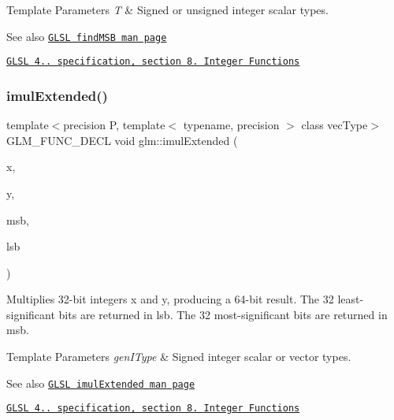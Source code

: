 \begin{DoxyTemplParams}{Template Parameters}
{\em T} & Signed or unsigned integer scalar types.\\
\hline
\end{DoxyTemplParams}
\begin{DoxySeeAlso}{See also}
\href{http://www.opengl.org/sdk/docs/manglsl/xhtml/findMSB.xml}{\tt G\+L\+SL find\+M\+SB man page} 

\href{http://www.opengl.org/registry/doc/GLSLangSpec.4.20.8.pdf}{\tt G\+L\+SL 4.. specification, section 8. Integer Functions} 
\end{DoxySeeAlso}
\mbox{\label{group__core__func__integer_ga6e6e8b29ca40d8ca2df10b58ed17d426}} 
\subsubsection{\texorpdfstring{imul\+Extended()}{imulExtended()}}
{\footnotesize\ttfamily template$<$precision P, template$<$ typename, precision $>$ class vec\+Type$>$ \\
G\+L\+M\+\_\+\+F\+U\+N\+C\+\_\+\+D\+E\+CL void glm\+::imul\+Extended (\begin{DoxyParamCaption}\item[{vec\+Type$<$ int, P $>$ const \&}]{x,  }\item[{vec\+Type$<$ int, P $>$ const \&}]{y,  }\item[{vec\+Type$<$ int, P $>$ \&}]{msb,  }\item[{vec\+Type$<$ int, P $>$ \&}]{lsb }\end{DoxyParamCaption})}

Multiplies 32-\/bit integers x and y, producing a 64-\/bit result. The 32 least-\/significant bits are returned in lsb. The 32 most-\/significant bits are returned in msb.


\begin{DoxyTemplParams}{Template Parameters}
{\em gen\+I\+Type} & Signed integer scalar or vector types.\\
\hline
\end{DoxyTemplParams}
\begin{DoxySeeAlso}{See also}
\href{http://www.opengl.org/sdk/docs/manglsl/xhtml/imulExtended.xml}{\tt G\+L\+SL imul\+Extended man page} 

\href{http://www.opengl.org/registry/doc/GLSLangSpec.4.20.8.pdf}{\tt G\+L\+SL 4.. specification, section 8. Integer Functions} 
\end{DoxySeeAlso}
\mbox{\label{group__core__func__integer_ga2fc1a46e7b7e9fbbd8fa444fbacaa2aa}} 
